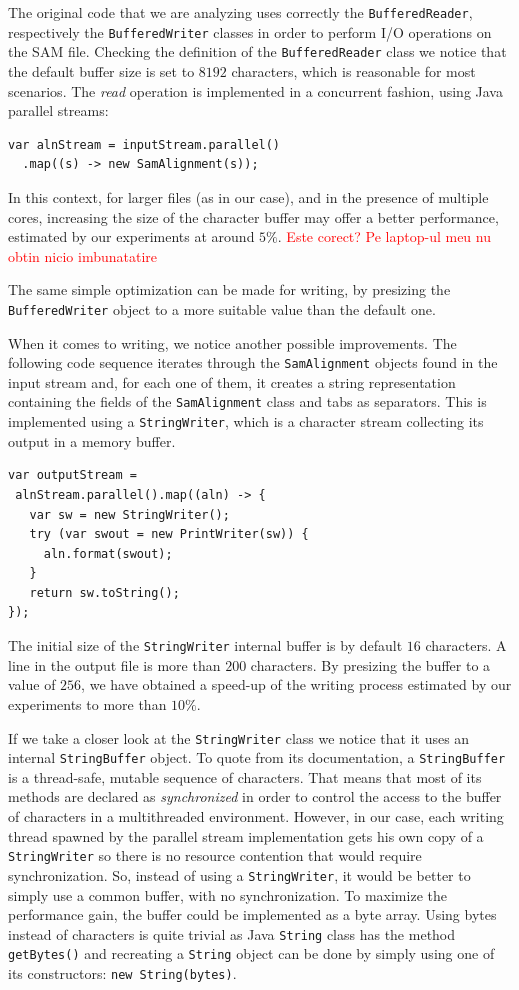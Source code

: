 \documentclass[a4paper,twoside]{article}
\begin{document}
The original code that we are analyzing uses correctly the {\tt BufferedReader}, respectively the {\tt BufferedWriter} classes in order to perform I/O operations on the SAM file.
Checking the definition of the {\tt BufferedReader} class we notice that the default buffer size is set to $8192$ characters, which is reasonable for most scenarios. The {\it read} operation is implemented in a concurrent fashion, using Java parallel streams:
\begin{verbatim}
var alnStream = inputStream.parallel()
  .map((s) -> new SamAlignment(s));
\end{verbatim}
In this context, for larger files (as in our case), and in the presence of multiple cores, increasing the size of the character buffer may offer a better performance, estimated by our experiments at around $5\%$. \textcolor{red}{Este corect? Pe laptop-ul meu nu obtin nicio imbunatatire}

The same simple optimization can be made for writing, by presizing the {\tt BufferedWriter} object to a more suitable value than the default one.

When it comes to writing, we notice another possible improvements. The following code sequence iterates through the {\tt SamAlignment} objects found in the input stream and, for each one of them, it creates a string representation containing the fields of the  {\tt SamAlignment} class and tabs as separators.
This is implemented using a {\tt StringWriter}, which is a character stream collecting its output in a memory buffer.
\begin{verbatim}
var outputStream = 
 alnStream.parallel().map((aln) -> {
   var sw = new StringWriter();
   try (var swout = new PrintWriter(sw)) {
     aln.format(swout);
   }
   return sw.toString();
});
\end{verbatim}

The initial size of the {\tt StringWriter} internal buffer is by default $16$ characters. A line in the output file is more than $200$ characters. By presizing the buffer to a value of $256$, we have obtained a speed-up of the writing process estimated by our experiments to more than $10\%$.

If we take a closer look at the {\tt StringWriter} class we notice that it uses an internal {\tt StringBuffer} object. To quote from its documentation, a {\tt StringBuffer} is  a thread-safe, mutable sequence of characters. That means that most of its methods are declared as {\it synchronized} in order to control the access to the buffer of characters in a multithreaded environment.
However, in our case, each writing thread spawned by the parallel stream implementation gets his own copy of a {\tt StringWriter} so there is no resource contention that would require synchronization.
So, instead of using a {\tt StringWriter}, it would be better to simply use a common buffer, with no synchronization. To maximize the performance gain, the buffer could be implemented as a byte array. 
Using bytes instead of characters is quite trivial as Java {\tt String} class has the method {\tt getBytes()} and recreating a {\tt String} object can be done by simply using one of its constructors: {\tt new String(bytes)}.
\end{document}
